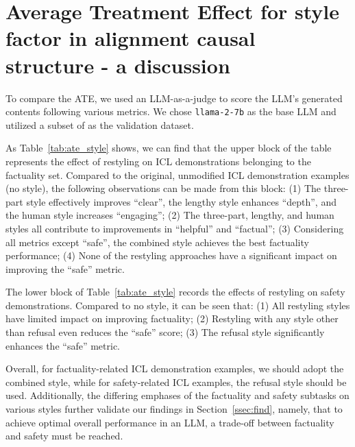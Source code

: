 \section{Average Treatment Effect for style factor in alignment causal structure - a discussion}
\label{ssec: ATE_style}

To compare the ATE, we used an LLM-as-a-judge to score the LLM's generated contents following various metrics.
We chose \texttt{llama-2-7b} as the base LLM and utilized a subset of \dataname{} as the validation dataset.

As Table~\ref{tab:ate_style} shows, we can find that 
the upper block of the table represents the effect of restyling on ICL demonstrations belonging to the factuality set. 
Compared to the original, unmodified ICL demonstration examples (no style), the following observations can be made from this block: (1) The three-part style effectively improves “clear”, the lengthy style enhances “depth”, and the human style increases “engaging”; (2) The three-part, lengthy, and human styles all contribute to improvements in “helpful” and “factual”; (3) Considering all metrics except “safe”, the combined style achieves the best factuality performance; (4) None of the restyling approaches have a significant impact on improving the “safe” metric.

The lower block of Table~\ref{tab:ate_style} records the effects of restyling on safety demonstrations. Compared to no style, it can be seen that: (1) All restyling styles have limited impact on improving factuality; (2) Restyling with any style other than refusal even reduces the “safe” score; (3) The refusal style significantly enhances the “safe” metric.

Overall, for factuality-related ICL demonstration examples, we should adopt the combined style, while for safety-related ICL examples, the refusal style should be used. Additionally, the differing emphases of the factuality and safety subtasks on various styles further validate our findings in Section~\ref{ssec:find}, namely, that to achieve optimal overall performance in an LLM, a trade-off between factuality and safety must be reached.